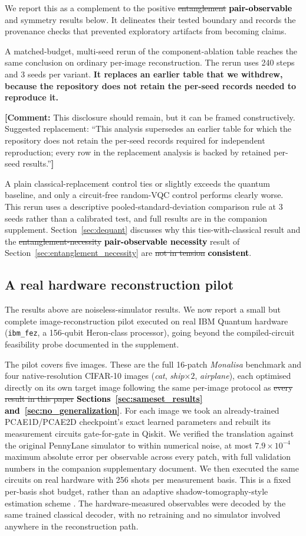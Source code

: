 \documentclass[pdflatex,sn-basic]{sn-jnl}
\newcommand{\del}[1]{\sout{#1}}
\newcommand{\add}[1]{\textbf{\textcolor{black}{#1}}}
\newcommand{\yellowcomment}[1]{%
  \par\smallskip\noindent
  \begingroup\setlength{\fboxsep}{3pt}%
  \colorbox{yellow!35}{\parbox{\dimexpr\linewidth-2\fboxsep\relax}{\textbf{[Comment:} #1\textbf{]}}}%
  \endgroup\par\smallskip}
\begin{document}
We report this as a complement to the positive \del{entanglement} \add{pair-observable}
and symmetry results below. It delineates their tested boundary and records the
provenance checks that prevented exploratory artifacts from becoming claims.

A matched-budget, multi-seed rerun of the component-ablation table reaches the
same conclusion on ordinary per-image reconstruction. The rerun uses 240 steps
and 3 seeds per variant. {\color{red}\textbf{It replaces an earlier table that
we withdrew, because the repository does not retain the per-seed records needed
to reproduce it.}}
\yellowcomment{This disclosure should remain, but it can be framed constructively. Suggested replacement: ``This analysis supersedes an earlier table for which the repository does not retain the per-seed records required for independent reproduction; every row in the replacement analysis is backed by retained per-seed results.''}
 A plain classical-replacement control ties or slightly
exceeds the quantum baseline, and only a circuit-free random-VQC control
performs clearly worse. This rerun uses a descriptive pooled-standard-deviation
comparison rule at 3 seeds rather than a calibrated test, and full results are in
the companion supplement. Section~\ref{sec:dequant} discusses why this
ties-with-classical result and the \del{entanglement-necessity}
\add{pair-observable necessity} result of
Section~\ref{sec:entanglement_necessity} are \del{not in tension} \add{consistent}.


\subsection{A real hardware reconstruction pilot}
\label{sec:hardware_pilot}

The results above are noiseless-simulator results. We now report a small but
complete image-reconstruction pilot executed on real IBM Quantum hardware
(\texttt{ibm\_fez}, a 156-qubit Heron-class processor), going beyond the
compiled-circuit feasibility probe documented in the supplement.

The pilot covers five images. These are the full 16-patch \textit{Monalisa}
benchmark and four native-resolution CIFAR-10 images (\textit{cat},
\textit{ship}$\times2$, \textit{airplane}), each optimised directly on its own
target image following the same per-image protocol as \del{every result in this
paper} \add{Sections~\ref{sec:sameset_results} and~\ref{sec:no_generalization}}. For each image we took an already-trained PCAE1D/PCAE2D checkpoint's exact
learned parameters and rebuilt its measurement circuits gate-for-gate in Qiskit.
We verified the translation against the original PennyLane simulator to within
numerical noise, at most $7.9\times10^{-4}$ maximum absolute error per
observable across every patch, with full validation numbers in the companion
supplementary document. We then executed the same circuits on real hardware with
256 shots per measurement basis. This is a fixed per-basis shot budget, rather
than an adaptive shadow-tomography-style estimation scheme
\citep{Huang2020Shadows}. The hardware-measured observables were decoded by the
same trained classical decoder, with no retraining and no simulator involved
anywhere in the reconstruction path.
\end{document}

